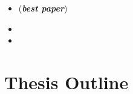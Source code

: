 \begin{comment}


\begin{itemize}
\item Johnatan A. de Oliveira, Eduardo M. Fernandes, and Eduardo Figueiredo. Evaluation of duplicated code detection tools in cross-project context. In VI Brazilian Conference on Software:Theory and Practice, III Workshop de Visualização, Evolução e Manutenção de Software (VEM), pages 49-56, 2015. 

\item Johnatan Oliveira, Eduardo Fernandes, Maurício Souza and  Eduardo Figueiredo. A Method Based on Naming Similarity to Identify Reuse Opportunities. In XII Brazilian Symposium on Information Systems (SBSI),  pages 305-312, 2016 (\textit{best paper}).

\item Johnatan Oliveira, Eduardo Figueiredo. A Recommendation System of Reuse Opportunities based on Lexical Analysis. In XII Brazilian Symposium on Information Systems (SBSI), Workshop of Theses and Dissertations in Information Systems (WTDSI), pages 49-51, 2016

\item Johnatan Oliveira, Eduardo Fernandes, Maurício Souza and  Eduardo Figueiredo. JReuse: A Tool to Support Reusable Asset Extraction in Java Projects. In VII Brazilian Conference on Software:Theory and Practice, Tools Section (...)  %

\end{itemize}
\end{comment}


\begin{itemize}
\item {} (\textbf{\emph{best paper}}) 
\item {}
\item {} 
\end{itemize}


\section{Thesis Outline}
\label{sec:outline}

